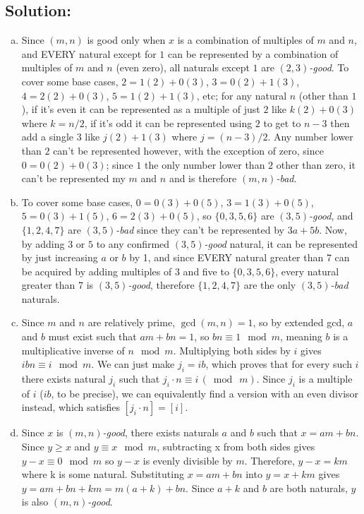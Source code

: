 \documentclass[12pt]{article}
\begin{document}
	\subsection*{\textbf{Solution:}}
	\begin{enumerate}[(a)]
		\item Since $(m,n)$ is good only when $x$ is a combination of multiples of $m$
			and $n$, and EVERY natural except for $1$ can be represented by a
			combination of multiples of $m$ and $n$ (even zero), all naturals except $1$
			are {\em $(2,3)$-good}. To cover some base cases, $2=1(2)+0(3)$,
			$3=0(2)+1(3)$, $4=2(2)+0(3)$, $5=1(2)+1(3)$, etc; for any natural $n$ (other
			than $1$), if it's even it can be represented as a multiple of just $2$ like
			$k(2)+0(3)$ where $k=n/2$, if it's odd it can be represented using $2$ to
			get to $n-3$ then add a single $3$ like $j(2)+1(3)$ where $j=(n-3)/2$. Any
			number lower than $2$ can't be represented however, with the exception of
			zero, since $0=0(2)+0(3)$; since $1$ the only number lower than $2$ other
			than zero, it can't be represented my $m$ and $n$ and is therefore {\em $(m,n)$-bad}.

		\item To cover some base cases, $0=0(3)+0(5)$, $3=1(3)+0(5)$, $5=0(3)+1(5)$,
			$6=2(3)+0(5)$, so $\{0,3,5,6\}$ are {\em $(3,5)$-good}, and $\{1,2,4,7\}$ are
			{\em $(3,5)$-bad} since they can't be represented by $3a+5b$. Now, by adding
			$3$ or $5$ to any confirmed {\em $(3,5)$-good} natural, it can be
			represented by just increasing $a$ or $b$ by 1, and since EVERY natural greater
			than 7 can be acquired by adding multiples of 3 and five to $\{0,3,5,6\}$,
			every natural greater than 7 is {\em $(3,5)$-good}, therefore $\{1,2,4,7\}$
			are the only {\em $(3,5)$-bad} naturals.

		\item Since $m$ and $n$ are relatively prime, $\gcd(m,n)=1$, so by extended gcd,
			$a$ and $b$ must exist such that $am+bn=1$, so $bn\equiv1\mod m$, meaning
			$b$ is a multiplicative inverse of $n\mod m$. Multiplying both sides by $i$
			gives $ibn\equiv i\mod m$. We can just make $j_{i}=ib$, which proves that for
			every such $i$ there exists natural $j_{i}$ such that $j_{i} \cdot n \equiv
			i \, (\bmod \ m)$. Since $j_{i}$ is a multiple of $i$ ($ib$, to be precise),
			we can equivalently find a version with an even divisor instead, which satisfies
			$[j_{i} \cdot n]= [i]$.

		\item Since $x$ is {\em $(m,n)$-good}, there exists naturals $a$ and $b$
			such that $x=am+bn$. Since $y\geq x$ and $y\equiv x\mod m$, subtracting x
			from both sides gives $y-x\equiv 0\mod m$ so $y-x$ is evenly divisible by
			$m$. Therefore, $y-x=km$ where k is some natural. Substituting $x=am+bn$ into
			$y=x+km$ gives $y=am+bn+km=m(a+k)+bn$. Since $a+k$ and $b$ are both
			naturals, $y$ is also {\em $(m,n)$-good}.


\end{enumerate}
\end{document}
